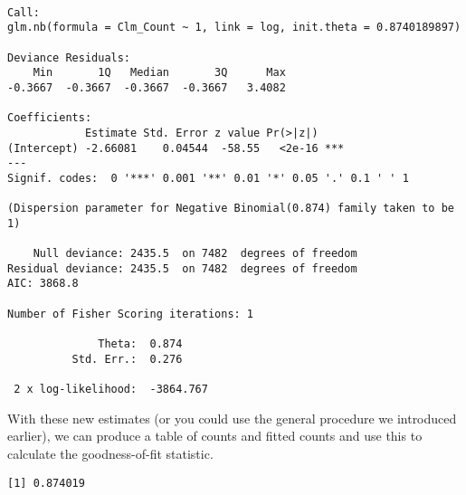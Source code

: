 \documentclass[]{book}
\newenvironment{Shaded}{\begin{snugshade}}{\end{snugshade}}
\newcommand{\OperatorTok}[1]{\textcolor[rgb]{0.81,0.36,0.00}{\textbf{#1}}}
\newcommand{\NormalTok}[1]{#1}
\theoremstyle{definition}
\theoremstyle{definition}
\theoremstyle{definition}
\theoremstyle{remark}
\begin{document}
\begin{verbatim}

Call:
glm.nb(formula = Clm_Count ~ 1, link = log, init.theta = 0.8740189897)

Deviance Residuals: 
    Min       1Q   Median       3Q      Max  
-0.3667  -0.3667  -0.3667  -0.3667   3.4082  

Coefficients:
            Estimate Std. Error z value Pr(>|z|)    
(Intercept) -2.66081    0.04544  -58.55   <2e-16 ***
---
Signif. codes:  0 '***' 0.001 '**' 0.01 '*' 0.05 '.' 0.1 ' ' 1

(Dispersion parameter for Negative Binomial(0.874) family taken to be 1)

    Null deviance: 2435.5  on 7482  degrees of freedom
Residual deviance: 2435.5  on 7482  degrees of freedom
AIC: 3868.8

Number of Fisher Scoring iterations: 1

              Theta:  0.874 
          Std. Err.:  0.276 

 2 x log-likelihood:  -3864.767 
\end{verbatim}

With these new estimates (or you could use the general procedure we
introduced earlier), we can produce a table of counts and fitted counts
and use this to calculate the goodness-of-fit statistic.

\begin{Shaded}
\end{Shaded}

\begin{verbatim}
[1] 0.874019
\end{verbatim}
\end{document}
